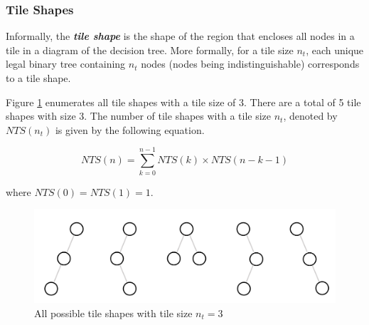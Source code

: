 \subsubsection{Tile Shapes}
Informally, the \textbf{\emph{tile shape}} is the shape of the region that encloses all nodes in a tile in a diagram of the decision tree. More formally, for a tile size $n_t$, each unique legal binary tree containing $n_t$ nodes (nodes being indistinguishable) corresponds to a tile shape.

Figure \ref{Fig:TileSize3Shapes} enumerates all tile shapes with a tile size of 3. There are a total of 5 tile shapes with size 3. The number of tile shapes with a tile size $n_t$, denoted by $NTS(n_t)$ is given by the following equation. 

\begin{equation}
  NTS(n) = \sum_{k=0}^{n-1} NTS(k) \times NTS(n-k-1)
\end{equation}

where $NTS(0) = NTS(1) = 1$.

\begin{figure}
  \centering
  \includegraphics[width=\linewidth]{figures/TileShapes_Size3.PNG}
  \caption{All possible tile shapes with tile size $n_t=3$}
  \label{Fig:TileSize3Shapes}
\end{figure}

